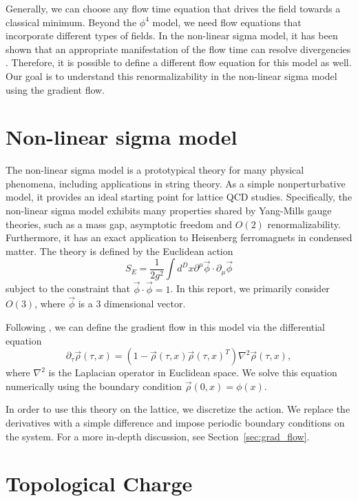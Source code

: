 \documentclass[12pt]{report}
\begin{document}
Generally, we can choose any flow time equation that drives the field towards a classical minimum. Beyond the $\phi^4$ model, we need flow equations that incorporate different types of fields. In the non-linear sigma model, it has been shown that an appropriate manifestation of the flow time can resolve divergencies \cite{makino2015a}. Therefore, it is possible to define a different flow equation for this model as well. Our goal is to understand this renormalizability in the non-linear sigma model using the gradient flow.


\section{Non-linear sigma model}

The non-linear sigma model is a prototypical theory for many physical phenomena, including applications in string theory. As a simple nonperturbative model, it provides an ideal starting point for lattice QCD studies. Specifically, the non-linear sigma model exhibits many properties shared by Yang-Mills gauge theories, such as a mass gap, asymptotic freedom and $O(2)$ renormalizability. Furthermore, it has an exact application to Heisenberg ferromagnets in condensed matter. The theory is defined by the Euclidean action 
\begin{equation}
    S_E = \frac{1}{2g^2} \int d^Dx \partial^\mu \vec\phi \cdot \partial_\mu \vec\phi
\end{equation}
subject to the constraint that $\vec\phi\cdot\vec\phi = 1$. In this report, we primarily consider $O(3)$, where $\vec\phi$ is a $3$ dimensional vector.

Following \cite{bietenholz2018}, we can define the gradient flow in this model via the differential equation
\begin{equation}
    \label{eq:nsm_gradflow}
    \partial_\tau \vec\rho (\tau,x) = \left( 1 - \vec\rho(\tau,x) \vec\rho(\tau,x)^T \right) \nabla^2 \vec\rho(\tau,x),
\end{equation}
where $\nabla^2$ is the Laplacian operator in Euclidean space. We solve this equation numerically using the boundary condition $\vec\rho(0,x) = \phi(x)$.

In order to use this theory on the lattice, we discretize the action. We replace the derivatives with a simple difference and impose periodic boundary conditions on the system. For a more in-depth discussion, see Section~\ref{sec:grad_flow}.

\section{Topological Charge}
\end{document}
